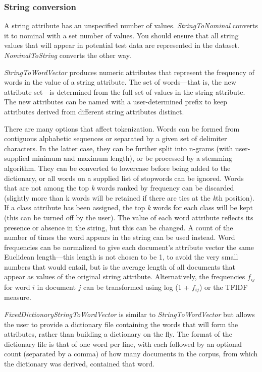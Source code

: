 \subsubsection{String conversion}
\label{subsubsection:string_conversion}

A string attribute has an unspecified number of
values. \textit{StringToNominal} converts it to nominal with a set
number of values. You should ensure that all string values that will
appear in potential test data are represented in the
dataset. \textit{NominalToString} converts the other way.

\textit{StringToWordVector} produces numeric attributes that represent
the frequency of words in the value of a string attribute. The set of
words—that is, the new attribute set---is determined from the full set
of values in the string attribute. The new attributes can be named
with a user-determined prefix to keep attributes derived from
different string attributes distinct.

There are many options that affect tokenization. Words can be formed
from contiguous alphabetic sequences or separated by a given set of
delimiter characters. In the latter case, they can be further split
into n-grams (with user-supplied minimum and maximum length), or be
processed by a stemming algorithm. They can be converted to lowercase
before being added to the dictionary, or all words on a supplied list
of stopwords can be ignored. Words that are not among the top
\textit{k} words ranked by frequency can be discarded (slightly more
than k words will be retained if there are ties at the \textit{k}th
position). If a class attribute has been assigned, the top \textit{k}
words for each class will be kept (this can be turned off by the
user). The value of each word attribute reflects its presence or
absence in the string, but this can be changed. A count of the number
of times the word appears in the string can be used instead. Word
frequencies can be normalized to give each document's attribute vector
the same Euclidean length---this length is not chosen to be 1, to
avoid the very small numbers that would entail, but is the average
length of all documents that appear as values of the original string
attribute. Alternatively, the frequencies $f_{ij}$ for word $i$ in
document $j$ can be transformed using log (1 + $f_{ij}$) or the TFIDF
measure.

\textit{FixedDictionaryStringToWordVector} is similar to
\textit{StringToWordVector} but allows the user to provide a
dictionary file containing the words that will form the attributes,
rather than building a dictionary on the fly.  The format of the
dictionary file is that of one word per line, with each followed by an
optional count (separated by a comma) of how many documents in the
corpus, from which the dictionary was derived, contained that word.

